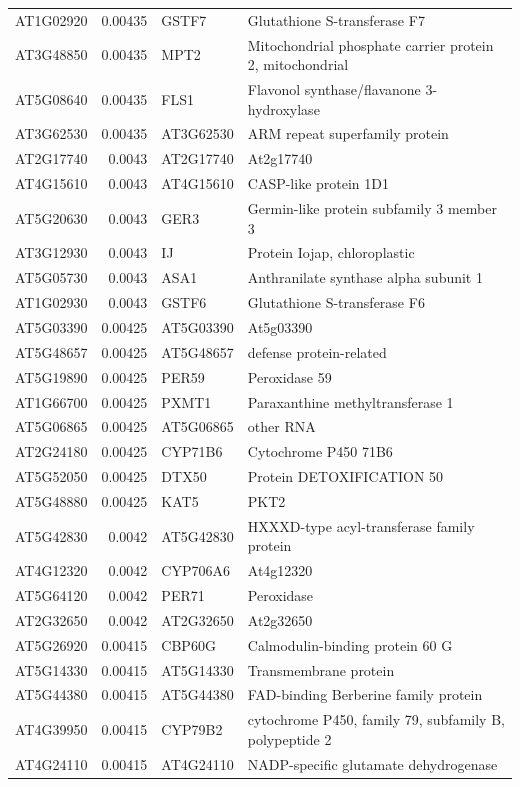 \documentclass[11pt]{article}
\begin{document}
\begin{center}
\begin{tabular}{lrll}
AT1G02920 & 0.00435 & GSTF7 & Glutathione S-transferase F7\\
AT3G48850 & 0.00435 & MPT2 & Mitochondrial phosphate carrier protein 2, mitochondrial\\
AT5G08640 & 0.00435 & FLS1 & Flavonol synthase/flavanone 3-hydroxylase\\
AT3G62530 & 0.00435 & AT3G62530 & ARM repeat superfamily protein\\
AT2G17740 & 0.0043 & AT2G17740 & At2g17740\\
AT4G15610 & 0.0043 & AT4G15610 & CASP-like protein 1D1\\
AT5G20630 & 0.0043 & GER3 & Germin-like protein subfamily 3 member 3\\
AT3G12930 & 0.0043 & IJ & Protein Iojap, chloroplastic\\
AT5G05730 & 0.0043 & ASA1 & Anthranilate synthase alpha subunit 1\\
AT1G02930 & 0.0043 & GSTF6 & Glutathione S-transferase F6\\
AT5G03390 & 0.00425 & AT5G03390 & At5g03390\\
AT5G48657 & 0.00425 & AT5G48657 & defense protein-related\\
AT5G19890 & 0.00425 & PER59 & Peroxidase 59\\
AT1G66700 & 0.00425 & PXMT1 & Paraxanthine methyltransferase 1\\
AT5G06865 & 0.00425 & AT5G06865 & other RNA\\
AT2G24180 & 0.00425 & CYP71B6 & Cytochrome P450 71B6\\
AT5G52050 & 0.00425 & DTX50 & Protein DETOXIFICATION 50\\
AT5G48880 & 0.00425 & KAT5 & PKT2\\
AT5G42830 & 0.0042 & AT5G42830 & HXXXD-type acyl-transferase family protein\\
AT4G12320 & 0.0042 & CYP706A6 & At4g12320\\
AT5G64120 & 0.0042 & PER71 & Peroxidase\\
AT2G32650 & 0.0042 & AT2G32650 & At2g32650\\
AT5G26920 & 0.00415 & CBP60G & Calmodulin-binding protein 60 G\\
AT5G14330 & 0.00415 & AT5G14330 & Transmembrane protein\\
AT5G44380 & 0.00415 & AT5G44380 & FAD-binding Berberine family protein\\
AT4G39950 & 0.00415 & CYP79B2 & cytochrome P450, family 79, subfamily B, polypeptide 2\\
AT4G24110 & 0.00415 & AT4G24110 & NADP-specific glutamate dehydrogenase\\

\end{tabular}
\end{center}
\end{document}
